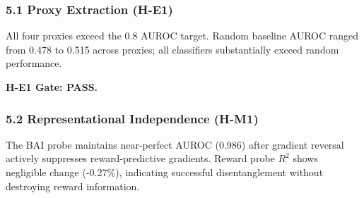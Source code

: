 
\subsubsection{5.1 Proxy Extraction (H-E1)}

\begin{table}[htbp]
\centering
{}
\end{table}

All four proxies exceed the 0.8 AUROC target. Random baseline AUROC ranged from 0.478 to 0.515 across proxies; all classifiers substantially exceed random performance.

\textbf{H-E1 Gate: PASS.}

\subsubsection{5.2 Representational Independence (H-M1)}

\begin{table}[htbp]
\centering
{}
\end{table}

The BAI probe maintains near-perfect AUROC (0.986) after gradient reversal actively suppresses reward-predictive gradients. Reward probe $R^2$ shows negligible change (-0.27\%), indicating successful disentanglement without destroying reward information.

